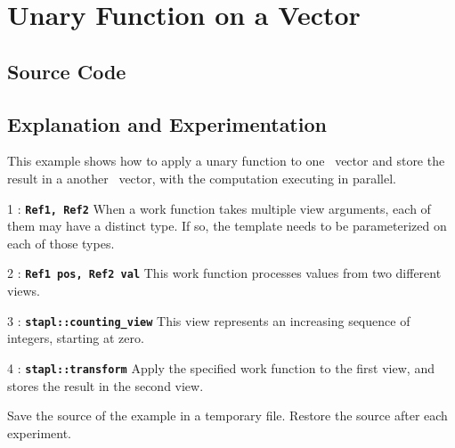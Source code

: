 \documentclass{report}
\begin{document}

\pagebreak
\section{Unary Function on a Vector}

\subsection{Source Code}



\subsection{Explanation and Experimentation}

This example shows how to
apply a unary function to one \stapl\ vector and store the result
in a another \stapl\ vector, with the computation executing in parallel.

\begin{hashitemize}
\item 1 : \texttt{{\bf Ref1, Ref2}}
\newline
When a work function takes multiple view arguments, each of them may have
a distinct type.  If so, the template needs to be parameterized on each
of those types.

\item 2 : \texttt{{\bf Ref1 pos, Ref2 val}}
\newline
This work function processes values from two different views.

\item 3 : \texttt{{\bf stapl::counting\_view}}
\newline
This view represents an increasing sequence of integers, starting at zero.

\item 4 : \texttt{{\bf stapl::transform}}
\newline
Apply the specified work function to the first view,
and stores the result in the second view.

\end{hashitemize}

Save the source of the example in a temporary file.
Restore the source after each experiment.
\end{document}
